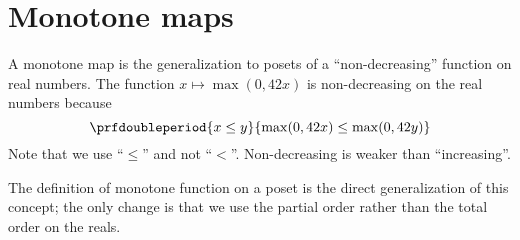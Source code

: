 
\section{Monotone maps}
\label{sec:monotonicity-monotone-maps}


A monotone map is the generalization to posets of a ``non-decreasing'' function on real numbers.
The function $x \mapsto \max(0, 42 x)$ is non-decreasing on the real numbers because
\begin{equation}\label{eq:monotone-eq-1}
    \prfdoubleperiod{
        x \leq y
    }{
        \max(0, 42 x) \leq \max(0, 42 y)
    }
\end{equation}
Note that we use ``$\leq$'' and not ``$<$''.
Non-decreasing is weaker than ``increasing''.

The definition of monotone function on a poset is the direct generalization of this concept; the only change  is that we use the partial order rather than the total order on the reals.

